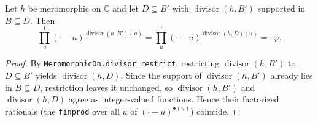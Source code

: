 \begin{lemma}
    \label{lem:factorizedRational-restrict}
    \leanok
    Let $h$ be meromorphic on $\mathbb{C}$ and let $D \subseteq B'$ with
    $\operatorname{divisor}(h, B')$ supported in $B \subseteq D$. Then
    \[
        \operatorname*{{\textstyle\prod}^{\mathrm f}}_{u}
          (\cdot-u)^{\operatorname{divisor}(h,B')(u)}
        = \operatorname*{{\textstyle\prod}^{\mathrm f}}_{u}
          (\cdot-u)^{\operatorname{divisor}(h,D)(u)} =: \varphi .
    \]
\end{lemma}
\begin{proof}
    By \texttt{MeromorphicOn.divisor\_restrict}, restricting
    $\operatorname{divisor}(h, B')$ to $D \subseteq B'$ yields
    $\operatorname{divisor}(h, D)$. Since the support of
    $\operatorname{divisor}(h, B')$ already lies in $B \subseteq D$, restriction
    leaves it unchanged, so $\operatorname{divisor}(h, B')$ and
    $\operatorname{divisor}(h, D)$ agree as integer-valued functions. Hence their
    factorized rationals (the \texttt{finprod} over all $u$ of
    $(\cdot-u)^{\bullet(u)}$) coincide.
\end{proof}


